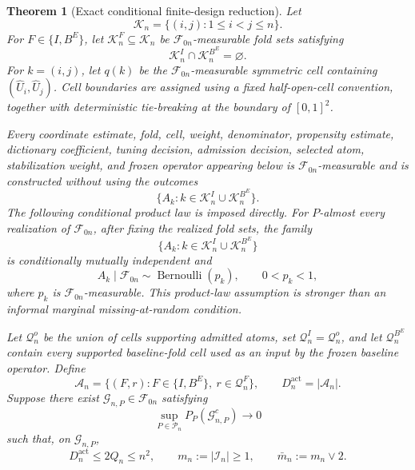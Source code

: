 \documentclass[11pt]{article}
\newtheorem{theorem}{Theorem}[section]
\theoremstyle{definition}
\newcommand{\1}{\mathbf 1}\newcommand{\op}{\operatorname}
\begin{document}
\begin{theorem}[Exact conditional finite-design reduction]\label{thm:linear}
\label{thm:exact-finite-design-reduction}
Let
\[
\mathcal K_n=\{(i,j):1\le i<j\le n\}.
\]
For $F\in\{I,B^E\}$, let
$\mathcal K_n^F\subseteq\mathcal K_n$ be
$\mathcal F_{0n}$-measurable fold sets satisfying
\begin{equation}
\mathcal K_n^I\cap\mathcal K_n^{B^E}=\varnothing.
\label{eq:disjoint-evaluation-folds}
\end{equation}
For $k=(i,j)$, let $q(k)$ be the
$\mathcal F_{0n}$-measurable symmetric cell containing
$(\widehat U_i,\widehat U_j)$. Cell boundaries are assigned using a
fixed half-open-cell convention, together with deterministic
tie-breaking at the boundary of $[0,1]^2$.

Every coordinate estimate, fold, cell, weight, denominator,
propensity estimate, dictionary coefficient, tuning decision,
admission decision, selected atom, stabilization weight, and frozen
operator appearing below is $\mathcal F_{0n}$-measurable and is
constructed without using the outcomes
\[
\{A_k:k\in\mathcal K_n^I\cup\mathcal K_n^{B^E}\}.
\]
The following conditional product law is imposed directly. For
$P$-almost every realization of $\mathcal F_{0n}$, after fixing the
realized fold sets, the family
\[
\{A_k:k\in\mathcal K_n^I\cup\mathcal K_n^{B^E}\}
\]
is conditionally mutually independent and
\begin{equation}
A_k\mid\mathcal F_{0n}
\sim\operatorname{Bernoulli}(p_k),
\qquad
0<p_k<1,
\label{eq:conditional-product-law-final}
\end{equation}
where $p_k$ is $\mathcal F_{0n}$-measurable. This product-law
assumption is stronger than an informal marginal
missing-at-random condition.

Let $\mathcal Q_n^o$ be the union of cells supporting admitted
atoms, set $\mathcal Q_n^I=\mathcal Q_n^o$, and let
$\mathcal Q_n^{B^E}$ contain every supported baseline-fold cell
used as an input by the frozen baseline operator. Define
\[
\mathcal A_n
=
\{(F,r):F\in\{I,B^E\},\ r\in\mathcal Q_n^F\},
\qquad
D_n^{\mathrm{act}}=|\mathcal A_n|.
\]
Suppose there exist
$\mathcal G_{n,P}\in\mathcal F_{0n}$ satisfying
\begin{equation}
\sup_{P\in\mathcal P_n}
P_P(\mathcal G_{n,P}^c)\longrightarrow0
\label{eq:uniform-good-event}
\end{equation}
such that, on $\mathcal G_{n,P}$,
\begin{equation}
D_n^{\mathrm{act}}\le2Q_n\le n^2,
\qquad
m_n:=|\mathcal I_n|\ge1,
\qquad
\bar m_n:=m_n\vee2.
\label{eq:active-dimension-final}
\end{equation}


\end{theorem}
\end{document}

